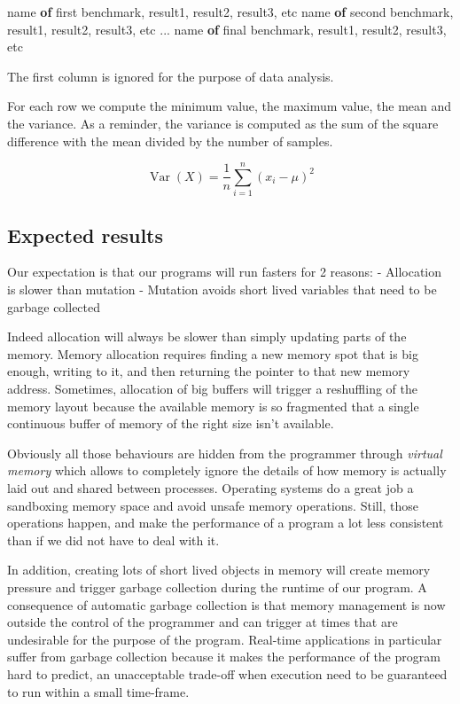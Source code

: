 \documentclass[
]{article}
\newenvironment{Shaded}{}{}
\newcommand{\KeywordTok}[1]{\textcolor[rgb]{0.00,0.44,0.13}{\textbf{#1}}}
\newcommand{\NormalTok}[1]{#1}
\newcommand{\OperatorTok}[1]{\textcolor[rgb]{0.40,0.40,0.40}{#1}}
\begin{document}
\begin{Shaded}
\begin{Highlighting}[]
\NormalTok{name }\KeywordTok{of}\NormalTok{ first benchmark, result1, result2, result3, etc}
\NormalTok{name }\KeywordTok{of}\NormalTok{ second benchmark, result1, result2, result3, etc}
\OperatorTok{...}
\NormalTok{name }\KeywordTok{of}\NormalTok{ final benchmark, result1, result2, result3, etc}
\end{Highlighting}
\end{Shaded}

The first column is ignored for the purpose of data analysis.

For each row we compute the minimum value, the maximum value, the mean
and the variance. As a reminder, the variance is computed as the sum of
the square difference with the mean divided by the number of samples.

\[ \operatorname{Var}(X) = \frac{1}{n} \sum_{i=1}^n (x_i - \mu)^2 \]

\hypertarget{expected-results}{%
\subsection{Expected results}\label{expected-results}}

Our expectation is that our programs will run fasters for 2 reasons: -
Allocation is slower than mutation - Mutation avoids short lived
variables that need to be garbage collected

Indeed allocation will always be slower than simply updating parts of
the memory. Memory allocation requires finding a new memory spot that is
big enough, writing to it, and then returning the pointer to that new
memory address. Sometimes, allocation of big buffers will trigger a
reshuffling of the memory layout because the available memory is so
fragmented that a single continuous buffer of memory of the right size
isn't available.

Obviously all those behaviours are hidden from the programmer through
\emph{virtual memory} which allows to completely ignore the details of
how memory is actually laid out and shared between processes. Operating
systems do a great job a sandboxing memory space and avoid unsafe memory
operations. Still, those operations happen, and make the performance of
a program a lot less consistent than if we did not have to deal with it.

In addition, creating lots of short lived objects in memory will create
memory pressure and trigger garbage collection during the runtime of our
program. A consequence of automatic garbage collection is that memory
management is now outside the control of the programmer and can trigger
at times that are undesirable for the purpose of the program. Real-time
applications in particular suffer from garbage collection because it
makes the performance of the program hard to predict, an unacceptable
trade-off when execution need to be guaranteed to run within a small
time-frame.
\end{document}
